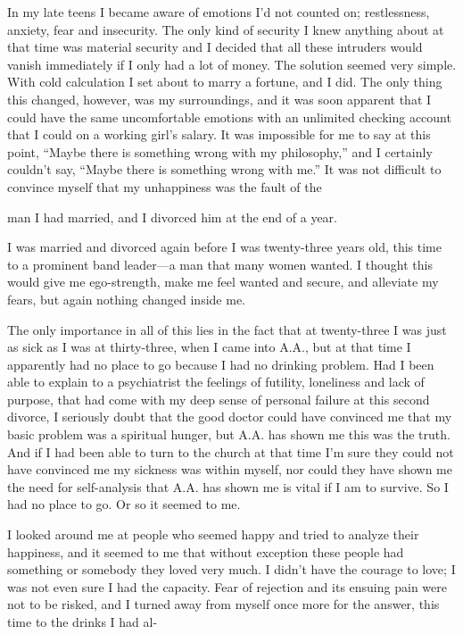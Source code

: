 In my late teens I became aware of emotions I’d not counted on; restlessness, anxiety, fear and insecurity. The only kind of security I knew anything about at that time was material security and I decided that all these intruders would vanish immediately if I only had a lot of money. The solution seemed very simple. With cold calculation I set about to marry a fortune, and I did. The only thing this changed, however, was my surroundings, and it was soon apparent that I could have the same uncomfortable emotions with an unlimited checking account that I could on a working girl’s salary. It was impossible for me to say at this point, “Maybe there is something wrong with my philosophy,” and I certainly couldn’t say, “Maybe there is something wrong with me.” It was not difficult to convince myself that my unhappiness was the fault of the

man I had married, and I divorced him at the end of a year.

I was married and divorced again before I was twenty-three years old, this time to a prominent band leader—a man that many women wanted. I thought this would give me ego-strength, make me feel wanted and secure, and alleviate my fears, but again nothing changed inside me.

The only importance in all of this lies in the fact that at twenty-three I was just as sick as I was at thirty-three, when I came into A.A., but at that time I apparently had no place to go because I had no drinking problem. Had I been able to explain to a psychiatrist the feelings of futility, loneliness and lack of purpose, that had come with my deep sense of personal failure at this second divorce, I seriously doubt that the good doctor could have convinced me that my basic problem was a spiritual hunger, but A.A. has shown me this was the truth. And if I had been able to turn to the church at that time I’m sure they could not have convinced me my sickness was within myself, nor could they have shown me the need for self-analysis that A.A. has shown me is vital if I am to survive. So I had no place to go. Or so it seemed to me.

I looked around me at people who seemed happy and tried to analyze their happiness, and it seemed to me that without exception these people had something or somebody they loved very much. I didn’t have the courage to love; I was not even sure I had the capacity. Fear of rejection and its ensuing pain were not to be risked, and I turned away from myself once more for the answer, this time to the drinks I had al-

